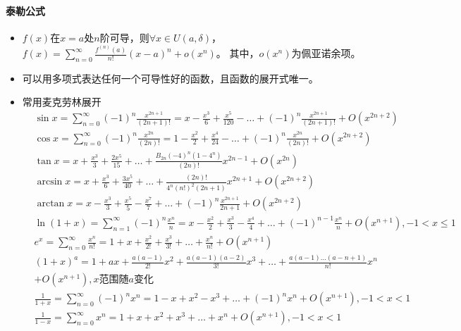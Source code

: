 \documentclass[
12pt, %
a4paper, 
oneside, %
headinclude,footinclude, %
]{scrartcl}
\begin{document}
\paragraph{泰勒公式}
\begin{itemize}
\item $ f(x) $在$ x = a $处$ n $阶可导，则$ \forall x \in U(a, \delta) $，
$ f(x) = \sum_{n = 0}^{\infty} \frac{f^{(n)}(a)}{n!}(x - a)^n + o(x^n) $。
其中，$ o(x^n) $为佩亚诺余项。
\item 可以用多项式表达任何一个可导性好的函数，且函数的展开式唯一。
\item 常用麦克劳林展开\label{sec:taylor}
\begin{align*}
&\sin x = \sum_{n = 0}^{\infty} (-1)^n \frac{x^{2n + 1}}{(2n + 1)!} = x - \frac{x^3}{6} + \frac{x^5}{120} - \dots + (-1)^n \frac{x^{2n + 1}}{(2n + 1)!} + O(x^{2n + 2}) \\
&\cos x = \sum_{n = 0}^{\infty} (-1)^n \frac{x^{2n}}{(2n)!} = 1 - \frac{x^2}{2} + \frac{x^4}{24} - \dots + (-1)^n \frac{x^{2n}}{(2n)!} + O(x^{2n + 2}) \\
&\tan x = x + \frac{x^3}{3} + \frac{2x^5}{15} + \dots + \frac{B_{2n} (-4)^n (1 - 4^n)}{(2n)!} x^{2n - 1} + O(x^{2n}) \\
&\arcsin x = x + \frac{x^3}{6} + \frac{3x^5}{40} + \dots + \frac{(2n)!}{4^n (n!)^2 (2n + 1)} x^{2n + 1} + O(x^{2n + 2}) \\
&\arctan x = x - \frac{x^3}{3} + \frac{x^5}{5} - \frac{x^7}{7} + \dots + (-1)^n \frac{x^{2n + 1}}{2n + 1} + O(x^{2n + 2}) \\
&\ln(1 + x) = \sum_{n = 1}^{\infty} (-1)^n \frac{x^n}{n} = x - \frac{x^2}{2} + \frac{x^3}{3} - \frac{x^4}{4} + \dots + (-1)^{n - 1} \frac{x^n}{n} + O(x^{n + 1}), -1 < x \leq 1 \\
&e^x = \sum_{n = 0}^{\infty} \frac{x^n}{n!} = 1 + x + \frac{x^2}{2!} + \frac{x^3}{3!} + \dots + \frac{x^n}{n!} + O(x^{n + 1}) \\
&(1 + x)^a = 1 + ax + \frac{a(a - 1)}{2!}x^2 + \frac{a(a - 1)(a - 2)}{3!}x^3 + \dots + \frac{a(a - 1)\dots(a - n + 1)}{n!}x^n \\
&+ O(x^{n + 1}), x \text{范围随} a \text{变化} \\
&\frac{1}{1 + x} = \sum_{n = 0}^{\infty} (-1)^n x^n = 1 - x + x^2 - x^3 + \dots + (-1)^n x^n + O(x^{n + 1}), -1 < x < 1 \\
&\frac{1}{1 - x} = \sum_{n = 0}^{\infty} x^n = 1 + x + x^2 + x^3 + \dots + x^n + O(x^{n + 1}), -1 < x < 1
\end{align*}
\end{itemize}
\end{document}
